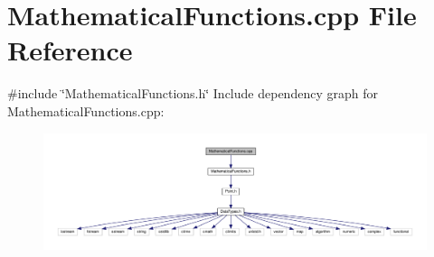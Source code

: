 \section{Mathematical\+Functions.\+cpp File Reference}
\label{_mathematical_functions_8cpp}
{\ttfamily \#include \char`\"{}Mathematical\+Functions.\+h\char`\"{}}\newline
Include dependency graph for Mathematical\+Functions.\+cpp\+:
\nopagebreak
\begin{figure}[H]
\begin{center}
\leavevmode
\includegraphics[width=350pt]{_mathematical_functions_8cpp__incl}
\end{center}
\end{figure}
